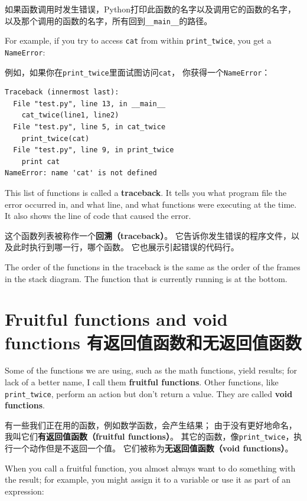 \documentclass[10pt]{book}
\begin{document}
\begin{CJK}{UTF8}{gbsn}
如果函数调用时发生错误，Python打印此函数的名字以及调用它的函数的名字，
以及那个调用的函数的名字，所有回到\verb"__main__"的路径。

For example, if you try to access {\tt cat} from within 
\verb"print_twice", you get a {\tt NameError}:

例如，如果你在\verb"print_twice"里面试图访问{\tt cat}，
你获得一个{\tt NameError}：

\begin{verbatim}
Traceback (innermost last):
  File "test.py", line 13, in __main__
    cat_twice(line1, line2)
  File "test.py", line 5, in cat_twice
    print_twice(cat)
  File "test.py", line 9, in print_twice
    print cat
NameError: name 'cat' is not defined
\end{verbatim}
%
This list of functions is called a {\bf traceback}.  It tells you what
program file the error occurred in, and what line, and what functions
were executing at the time.  It also shows the line of code that
caused the error.

这个函数列表被称作一个{\bf 回溯（traceback）}。
它告诉你发生错误的程序文件，以及此时执行到哪一行，哪个函数。
它也展示引起错误的代码行。

The order of the functions in the traceback is the same as the
order of the frames in the stack diagram.  The function that is
currently running is at the bottom.


\section{Fruitful functions and void functions 有返回值函数和无返回值函数}

Some of the functions we are using, such as the math functions, yield
results; for lack of a better name, I call them {\bf fruitful
  functions}.  Other functions, like \verb"print_twice", perform an
action but don't return a value.  They are called {\bf void
  functions}.
  
有一些我们正在用的函数，例如数学函数，会产生结果；
由于没有更好地命名，我叫它们{\bf 有返回值函数（fruitful functions）}。
其它的函数，像\verb"print_twice"，执行一个动作但是不返回一个值。
它们被称为{\bf 无返回值函数（void functions）}。

When you call a fruitful function, you almost always
want to do something with the result; for example, you might
assign it to a variable or use it as part of an expression:


\end{CJK}
\end{document}
